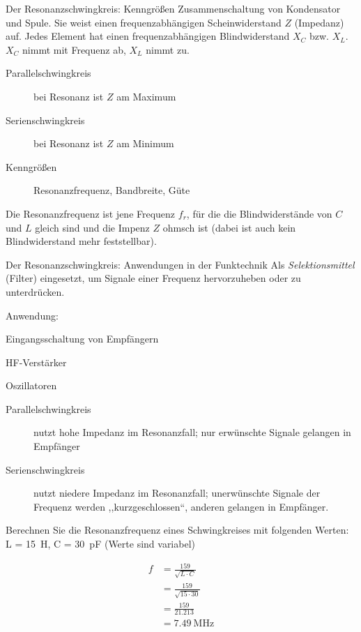 \documentclass[avery5371,grid,frame,a4paper]{flashcards}
\newcommand{\card}[3]{
  \begin{flashcard}[{\chap} -- #1]{#2}#3\end{flashcard}
}
\begin{document}
\card{18}{Der Resonanzschwingkreis: Kenngrößen}{
  \footnotesize
  Zusammenschaltung von Kondensator und Spule. Sie weist einen frequenzabhängigen Scheinwiderstand $Z$ (Impedanz) auf. Jedes Element hat einen frequenzabhängigen Blindwiderstand $X_C$ bzw. $X_L$. $X_C$ nimmt mit Frequenz ab, $X_L$ nimmt zu.

  \begin{description}
    \item[Parallelschwingkreis] bei Resonanz ist $Z$ am Maximum
    \item[Serienschwingkreis] bei Resonanz ist $Z$ am Minimum
    \item[Kenngrößen] Resonanzfrequenz, Bandbreite, Güte
  \end{description}

  Die Resonanzfrequenz ist jene Frequenz $f_r$, für die die Blindwiderstände von $C$ und $L$ gleich sind und die Impenz $Z$ ohmsch ist (dabei ist auch kein Blindwiderstand mehr feststellbar).
}
\card{19}{Der Resonanzschwingkreis: Anwendungen in der Funktechnik}{
  \small
  Als \emph{Selektionsmittel} (Filter) eingesetzt, um Signale einer Frequenz hervorzuheben oder zu unterdrücken.

  Anwendung:
  \begin{itemize*}
    \item Eingangsschaltung von Empfängern
    \item HF-Verstärker
    \item Oszillatoren
  \end{itemize*}

  \begin{description}
    \item[Parallelschwingkreis] nutzt hohe Impedanz im Resonanzfall; nur erwünschte Signale gelangen in Empfänger
    \item[Serienschwingkreis] nutzt niedere Impedanz im Resonanzfall; unerwünschte Signale der Frequenz werden ,,kurzgeschlossen``, anderen gelangen in Empfänger.
  \end{description}
}
\card{20}{Berechnen Sie die Resonanzfrequenz eines Schwingkreises mit folgenden Werten: L = \SI{15}{\henry}, C = \SI{30}{\pico\farad} (Werte sind variabel)}{

  {\begin{align*}
    f &= \frac{159}{\sqrt{L\cdot C}} \\
      &= \frac{159}{\sqrt{15 \cdot 30}} \\
      &= \frac{159}{21.213} \\
      &= \SI{7.49}{\mega\Hz} \\
  \end{align*}}
}
\end{document}
